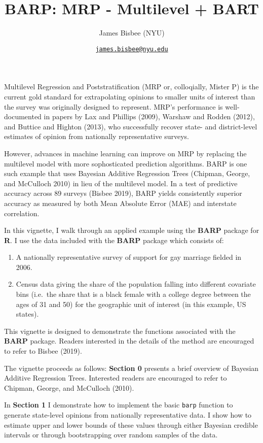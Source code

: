 \documentclass[]{article}
\title{BARP: MRP - Multilevel + BART}
\author{James Bisbee (NYU)}
\date{\href{mailto:james.bisbee@nyu.edu}{\nolinkurl{james.bisbee@nyu.edu}}}
\providecommand{\tightlist}{%
  \setlength{\itemsep}{0pt}\setlength{\parskip}{0pt}}
\begin{document}
\maketitle

Multilevel Regression and Poststratification (MRP or, colloqially,
Mister P) is the current gold standard for extrapolating opinions to
smaller units of interest than the survey was originally designed to
represent. MRP's performance is well-documented in papers by Lax and
Phillips (2009), Warshaw and Rodden (2012), and Buttice and Highton
(2013), who successfully recover state- and district-level estimates of
opinion from nationally representative surveys.

However, advances in machine learning can improve on MRP by replacing
the multilevel model with more sophosticated prediction algorithms. BARP
is one such example that uses Bayesian Additive Regression Trees
(Chipman, George, and McCulloch 2010) in lieu of the multilevel model.
In a test of predictive accuracy across 89 surveys (Bisbee 2019), BARP
yields consistently superior accuracy as measured by both Mean Absolute
Error (MAE) and interstate correlation.

In this vignette, I walk through an applied example using the
\textbf{BARP} package for \textbf{R}. I use the data included with the
\textbf{BARP} package which consists of:

\begin{enumerate}
\def\labelenumi{\arabic{enumi}.}
\tightlist
\item
  A nationally representative survey of support for gay marriage fielded
  in 2006.
\item
  Census data giving the share of the population falling into different
  covariate bins (i.e.~the share that is a black female with a college
  degree between the ages of 31 and 50) for the geographic unit of
  interest (in this example, US states).
\end{enumerate}

This vignette is designed to demonstrate the functions associated with
the \textbf{BARP} package. Readers interested in the details of the
method are encouraged to refer to Bisbee (2019).

The vignette proceeds as follows: \textbf{Section 0} presents a brief
overview of Bayesian Additive Regression Trees. Interested readers are
encouraged to refer to Chipman, George, and McCulloch (2010).

In \textbf{Section 1} I demonstrate how to implement the basic
\texttt{barp} function to generate state-level opinions from nationally
representative data. I show how to estimate upper and lower bounds of
these values through either Bayesian credible intervals or through
bootstrapping over random samples of the data.
\end{document}

